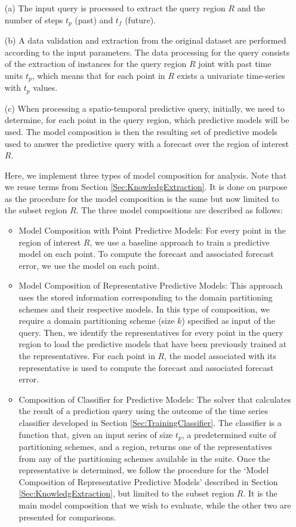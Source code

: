 \begin{itemize}
 \item [(a)] The input query is processed to extract the query region $R$ and the number of steps $t_p$ (past) and $t_f$ (future).
 \item [(b)] A data validation and extraction from the original dataset are performed according to the input parameters. The data processing for the query consists of the extraction of instances for the query region $R$ joint with past time units $t_{p}$, which means that for each point in $R$ exists a univariate time-series with $t_{p}$ values.
 \item [(c)] When processing a spatio-temporal predictive query, initially, we need to determine, for each point in the query region, which predictive models will be used. The model composition is then the resulting set of predictive models used to answer the predictive query with a forecast over the region of interest $R$. 
 
 Here, we implement three types of model composition for analysis. Note that we reuse terms from Section \ref{Sec:KnowledgExtraction}. It is done on purpose as the procedure for the model composition is the same but now limited to the subset region $R$. The three model compositions are described as follows:

 \begin{itemize}
	\item Model Composition with Point Predictive Models: For every point in the region of interest $R$, we use a baseline approach to train a predictive model on each point. To compute the forecast and associated forecast error, we use the model on each point.

	\item Model Composition of Representative Predictive Models: This approach uses the stored information corresponding to the domain partitioning schemes and their respective models. In this type of composition, we require a domain partitioning scheme (size $k$) specified as input of the query. Then, we identify the representatives for every point in the query region to load the predictive models that have been previously trained at the representatives. For each point in $R$, the model associated with its representative is used to compute the forecast and associated forecast error.
	
	\item Composition of Classifier for Predictive Models: The solver that calculates the result of a prediction query using the outcome of the time series classifier developed in Section \ref{Sec:TrainingClassifier}. The classifier is a function that, given an input series of size $t_p$, a predetermined suite of partitioning schemes, and a region, returns one of the representatives from any of the partitioning schemes available in the suite. Once the representative is determined, we follow the procedure for the `Model Composition of Representative Predictive Models' described in Section \ref{Sec:KnowledgExtraction}, but limited to the subset region $R$. It is the main model composition that we wish to evaluate, while the other two are presented for comparisons.
\end{itemize}
 

\end{itemize}
